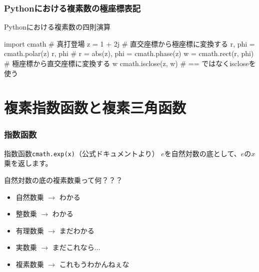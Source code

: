 \documentclass[dvipdfmx,11pt,notheorems]{beamer}
\theoremstyle{definition}
\begin{document}
\begin{frame}[fragile]\frametitle{Pythonにおける複素数の極座標表記}
\begin{exampleblock}{Pythonにおける複素数の四則演算}
\begin{pyconsole}
import cmath  # 真打登場
z = 1 + 2j  # 直交座標から極座標に変換する
r, phi = cmath.polar(z)
r, phi  # r = abs(z), phi = cmath.phase(z)
w = cmath.rect(r, phi)  # 極座標から直交座標に変換する
w
cmath.isclose(z, w)  # == ではなくiscloseを使う
\end{pyconsole}
\end{exampleblock}

\end{frame}


\section{複素指数函数と複素三角函数}

\begin{frame}\frametitle{指数函数}

\begin{block}{指数函数\texttt{cmath.exp(x)}（公式ドキュメントより）}
$e$を自然対数の底として、$e$の$x$乗を返します。
\end{block}

\begin{alertblock}{自然対数の底の複素数乗って何？？？}
\begin{itemize}
\item 自然数乗 $\rightarrow$ わかる
\item 整数乗 $\rightarrow$ わかる
\item 有理数乗 $\rightarrow$ まだわかる
\item 実数乗 $\rightarrow$ まだこれなら...
\item 複素数乗 $\rightarrow$ これもうわかんねぇな
\end{itemize}
\end{alertblock}

\end{frame}
\end{document}
